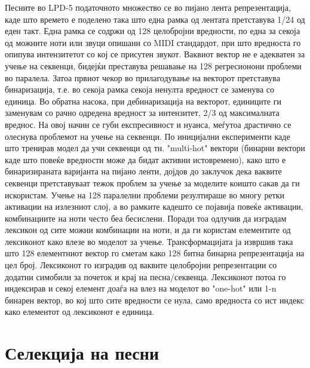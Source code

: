 Песните во LPD-5 податочното множество се во пијано лента репрезентација, каде што времето е поделено така што една рамка од лентата претставува 1/24 од еден такт. Една рамка се содржи од 128 целобројни вредности, по една за секоја од можните ноти или звуци опишани со MIDI стандардот, при што вредноста го опипува интензитетот со кој се присутен звукот. Ваквиот вектор не е адекватен за учење на секвенци, бидејќи преставува решавање на 128 регресионони проблеми во паралела. Затоа првиот чекор во прилагодување на векторот претставува бинаризација, т.е. во секоја рамка секоја ненулта вредност се заменува со единица. Во обратна насока, при дебинаризација на векторот, единиците ги заменувам со рачно одредена вредност за интензитет, 2/3 од максималната вреднос. На овој начин се губи експресивност и нуанса, меѓутоа драстично се олеснува проблемот на учење на секвенци. 
По иницијални експерименти каде што тренирав модел да учи секвенци од тн. "multi-hot" вектори (бинарни вектори каде што повеќе вредности може да бидат активни истовремено), како што е бинаризираната варијанта на пијано ленти, дојдов до заклучок дека ваквите секвенци претставуваат тежок проблем за учење за моделите коишто сакав да ги искористам. Учење на 128 паралелни проблеми резултираше во многу ретки активации на излезниот слој, а во рамките кадешто се појавија повеќе активации, комбинациите на ноти често беа бесислени. Поради тоа одлучив да изградам лексикон од сите можни комбинации на ноти, и да ги користам елементите од лексиконот како влезе во моделот за учење. Трансформацијата ја извршив така што 128 елементниот вектор го сметам како 128 битна бинарна репрезентација на цел број. Лексиконот го изградив од ваквите целобројни репрезентации со додатни симобили за почеток и крај на песна/секвенца. Лексиконот потоа го индексирав и секој елемент доаѓа на влез на моделот во "one-hot" или 1-n бинарен вектор, во кој што сите вредности се нула, само вредноста со ист индекс како елементот од лексиконот е единица.

\section{Селекција на песни}

